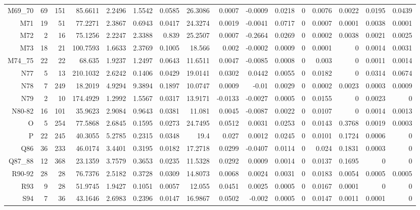\begin{table}[!htb]
{\begin{tabular}{rrrrrrrrrrrrrrrr}
M69\_70 & 69 & 151 & 85.6611 & 2.2496 & 1.5542 & 0.0585 & 26.3086 & 0.0007 & -0.0009 & 0.0218 & 0 & 0.0076 & 0.0022 & 0.0195 & 0.0439 \\
M71 & 19 & 51 & 77.2271 & 2.3867 & 0.6943 & 0.0417 & 24.3274 & 0.0019 & -0.0041 & 0.0717 & 0 & 0.0007 & 0.0001 & 0.0038 & 0.0001 \\
M72 & 2 & 16 & 75.1256 & 2.2247 & 2.3388 & 0.839 & 25.2507 & 0.0007 & -0.2664 & 0.0269 & 0 & 0.0002 & 0.0038 & 0.0021 & 0.0025 \\
M73 & 18 & 21 & 100.7593 & 1.6633 & 2.3769 & 0.1005 & 18.566 & 0.002 & -0.0002 & 0.0009 & 0 & 0.0001 & 0 & 0.0014 & 0.0031 \\
M74\_75 & 22 & 22 & 68.635 & 1.9237 & 1.2497 & 0.0643 & 11.6511 & 0.0047 & -0.0085 & 0.0008 & 0 & 0.003 & 0 & 0.0011 & 0.0014 \\
N77 & 5 & 13 & 210.1032 & 2.6242 & 0.1406 & 0.0429 & 19.0141 & 0.0302 & 0.0442 & 0.0055 & 0 & 0.0182 & 0 & 0.0314 & 0.0674 \\
N78 & 7 & 249 & 18.2019 & 4.9294 & 9.3894 & 0.1897 & 10.0747 & 0.0009 & -0.01 & 0.0029 & 0 & 0.0002 & 0.0023 & 0.0003 & 0.0009 \\
N79 & 2 & 10 & 174.4929 & 1.2992 & 1.5567 & 0.0317 & 13.9171 & -0.0133 & -0.0027 & 0.0005 & 0 & 0.0155 & 0 & 0.0023 & 0 \\
N80-82 & 16 & 101 & 35.9623 & 2.9084 & 0.9643 & 0.0381 & 11.081 & 0.0045 & -0.0087 & 0.0022 & 0 & 0.0107 & 0 & 0.0014 & 0.0013 \\
O & 5 & 254 & 77.5868 & 2.6845 & 0.1595 & 0.0273 & 24.7495 & 0.0512 & 0.0031 & 0.0253 & 0 & 0.0143 & 0.3768 & 0.0019 & 0.0003 \\
P & 22 & 245 & 40.3055 & 5.2785 & 0.2315 & 0.0348 & 19.4 & 0.027 & 0.0012 & 0.0245 & 0 & 0.0101 & 0.1724 & 0.0006 & 0 \\
Q86 & 36 & 233 & 46.0174 & 3.4401 & 0.3195 & 0.0182 & 17.2718 & 0.0299 & -0.0407 & 0.0114 & 0 & 0.024 & 0.1831 & 0.0003 & 0 \\
Q87\_88 & 12 & 368 & 23.1359 & 3.7579 & 0.3653 & 0.0235 & 11.5328 & 0.0292 & 0.0009 & 0.0014 & 0 & 0.0137 & 0.1695 & 0 & 0 \\
R90-92 & 28 & 28 & 76.7376 & 2.5182 & 0.3728 & 0.0309 & 14.8073 & 0.0068 & 0.0024 & 0.0031 & 0 & 0.0183 & 0.0054 & 0.0005 & 0.0005 \\
R93 & 9 & 28 & 51.9745 & 1.9427 & 0.1051 & 0.0057 & 12.055 & 0.0451 & 0.0025 & 0.0005 & 0 & 0.0167 & 0.0001 & 0 & 0 \\
S94 & 7 & 36 & 43.1646 & 2.6983 & 0.2396 & 0.0147 & 16.9867 & 0.0502 & -0.002 & 0.0005 & 0 & 0.0147 & 0.0011 & 0.0001 & 0 \\

\end{tabular}}
\end{table}
